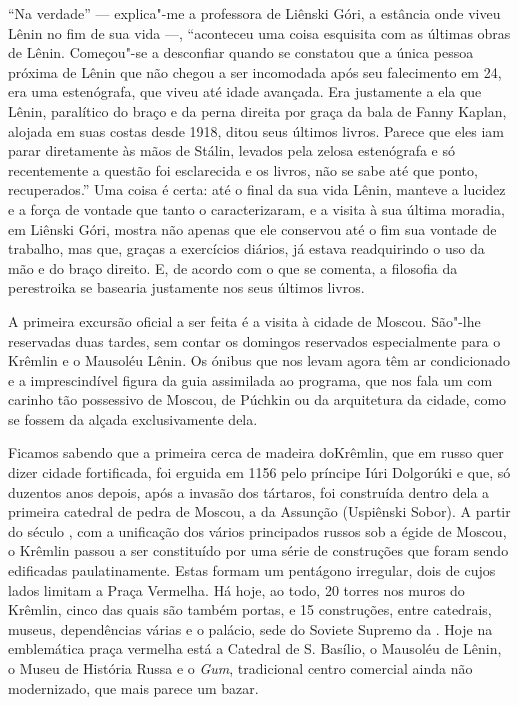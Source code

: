``Na verdade'' --- explica"-me a professora de Liênski Góri, a estância
onde viveu Lênin no fim de sua vida ---, ``aconteceu uma coisa esquisita
com as últimas obras de Lênin. Começou"-se a desconfiar quando se
constatou que a única pessoa próxima de Lênin que não chegou a ser
incomodada após seu falecimento em 24, era uma estenógrafa, que viveu
até idade avançada. Era justamente a ela que Lênin, paralítico do braço
e da perna direita por graça da bala de Fanny Kaplan, alojada em suas
costas desde 1918, ditou seus últimos livros. Parece que eles iam parar
diretamente às mãos de Stálin, levados pela zelosa estenógrafa e só
recentemente a questão foi esclarecida e os livros, não se sabe até que
ponto, recuperados.'' Uma coisa é certa: até o final da sua vida Lênin,
manteve a lucidez e a força de vontade que tanto o caracterizaram, e a
visita à sua última moradia, em Liênski Góri, mostra não apenas que ele
conservou até o fim sua vontade de trabalho, mas que, graças a
exercícios diários, já estava readquirindo o uso da mão e do braço
direito. E, de acordo com o que se comenta, a filosofia da perestroika
se basearia justamente nos seus últimos livros.

A primeira excursão oficial a ser feita é a visita à cidade de Moscou.
São"-lhe reservadas duas tardes, sem contar os domingos reservados
especialmente para o Krêmlin e o Mausoléu Lênin. Os ónibus que nos levam
agora têm ar condicionado e a imprescindível figura da guia assimilada
ao programa, que nos fala um com carinho tão possessivo de Moscou, de
Púchkin ou da arquitetura da cidade, como se fossem da alçada
exclusivamente dela.

Ficamos sabendo que a primeira cerca de madeira doKrêmlin, que em russo
quer dizer cidade fortificada, foi erguida em 1156 pelo príncipe Iúri
Dolgorúki e que, só duzentos anos depois, após a invasão dos tártaros,
foi construída dentro dela a primeira catedral de pedra de Moscou, a da
Assunção (Uspiênski Sobor). A partir do século , com a unificação dos
vários principados russos sob a égide de Moscou, o Krêmlin passou a ser
constituído por uma série de construções que foram sendo edificadas
paulatinamente. Estas formam um pentágono irregular, dois de cujos lados
limitam a Praça Vermelha. Há hoje, ao todo, 20 torres nos muros do
Krêmlin, cinco das quais são também portas, e 15 construções, entre
catedrais, museus, dependências várias e o palácio, sede do Soviete
Supremo da . Hoje na emblemática praça vermelha está a Catedral de
S. Basílio, o Mausoléu de Lênin, o Museu de História Russa e o
\emph{Gum}, tradicional centro comercial ainda não modernizado, que mais
parece um bazar.

